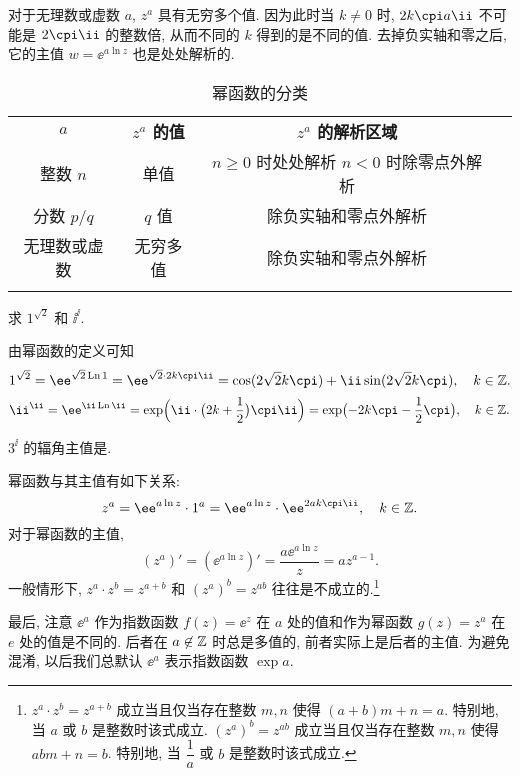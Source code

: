 对于无理数或虚数 $a$, $z^a$ 具有无穷多个值.
因为此时当 $k\neq0$ 时, $2k\cpi a \ii$ 不可能是 $2\cpi \ii$ 的整数倍, 从而不同的 $k$ 得到的是不同的值.
去掉负实轴和零之后, 它的主值 $w=\ee^{a\ln z}$ 也是处处解析的.

\begin{table}[!htb]
  \centering
  \begin{tabular}{cccc}
    \topcolorrule
      \bf $a$&
      \bf $z^a$ 的值&
      \bf  $z^a$ 的解析区域\\
    \topcolorrule
      整数 $n$&
      单值&
      \makecell{$n\ge0$ 时处处解析\\$n<0$ 时除零点外解析}\\
    \midcolorrule
      分数 $p/q$&
      $q$ 值&
      除负实轴和零点外解析\\
    \midcolorrule
      无理数或虚数&
      无穷多值&
      除负实轴和零点外解析\\
    \bottomcolorrule
  \end{tabular}
  \caption{幂函数的分类}
\end{table}

\begin{example}
  求 $1^{\sqrt 2}$ 和 $\ii^\ii$.
\end{example}
\begin{solution}
  由幂函数的定义可知
  \[
    1^{\sqrt2}=\ee^{\sqrt2\Ln1}
      =\ee^{\sqrt 2\cdot 2k\cpi\ii}
      =\cos(2\sqrt 2k\cpi)+\ii\sin(2\sqrt 2k\cpi), \quad k\in\BZ.
  \]
  \[
    \ii^\ii=\ee^{\ii\Ln \ii}
      =\exp\Bigl(\ii\cdot\bigl(2k+\half\bigr)\cpi\ii\Bigr)
      =\exp\bigl(-2k\cpi-\half\cpi\bigr), \quad k\in\BZ.
  \]
\end{solution}

\begin{exercise}
  $3^\ii$ 的辐角主值是\fillblank{}.
\end{exercise}

幂函数与其主值有如下关系:
\[
  z^a=\ee^{a\ln z}\cdot 1^a
    =\ee^{a\ln z}\cdot \ee^{2ak\cpi\ii},\quad k\in\BZ.
\]
对于幂函数的主值,
\[
  (z^a)'=(\ee^{a\ln z})'=\frac{a\ee^{a\ln z}}z=az^{a-1}.
\]
一般情形下, $z^a\cdot z^b=z^{a+b}$ 和 $(z^a)^b=z^{ab}$ 往往是不成立的.\footnote{%
  $z^a\cdot z^b=z^{a+b}$ 成立当且仅当存在整数 $m,n$ 使得 $(a+b)m+n=a$.
  特别地, 当 $a$ 或 $b$ 是整数时该式成立.
  $(z^a)^b=z^{ab}$ 成立当且仅当存在整数 $m,n$ 使得 $abm+n=b$.
  特别地, 当 $\dfrac1a$ 或 $b$ 是整数时该式成立.
}

最后, 注意 $\ee^a$ 作为指数函数 $f(z)=\ee^z$ 在 $a$ 处的值和作为幂函数 $g(z)=z^a$ 在 $e$ 处的值是\alert{不同}的.
后者在 $a\not\in{\mathbb{Z}}$ 时总是多值的, 前者实际上是后者的主值.
为避免混淆, 以后我们总\alert{默认 $\ee^a$ 表示指数函数 $\exp a$}.


